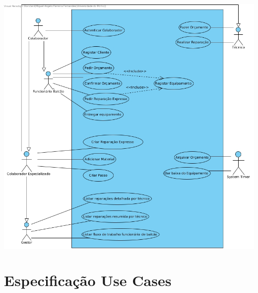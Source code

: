 \documentclass[a4paper,12pt]{scrreprt}
\begin{document}
\includegraphics[scale=0.45]{dss-usecase.jpg}

\section{Especificação Use Cases}

\subsection{} \label{criar_rep_expresso}


\subsection{} \label{pedir_orcamento}


\subsection{} \label{fazer_orcamento}


\subsection{} \label{criar_passo_rep}

\end{document}
